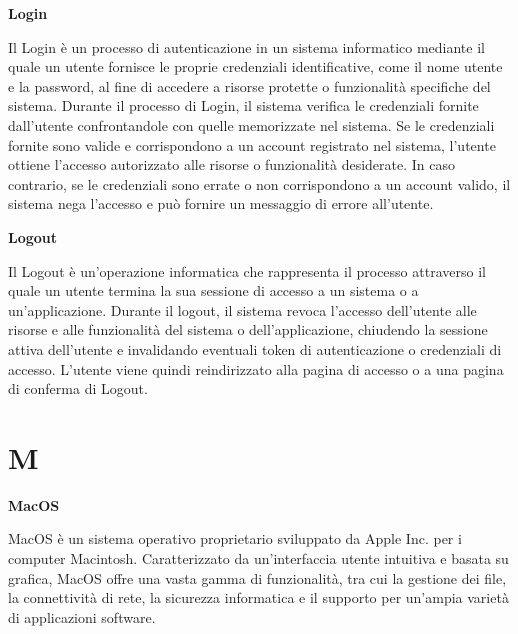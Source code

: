 \documentclass{article}
\begin{document}
\vspace{0.4cm}

\textbf{Login}

\vspace{0.1cm}

Il Login è un processo di autenticazione in un sistema informatico mediante il quale un utente fornisce le proprie credenziali identificative, come il nome utente e la password, al fine di accedere a risorse protette o funzionalità specifiche del sistema. Durante il processo di Login, il sistema verifica le credenziali fornite dall'utente confrontandole con quelle memorizzate nel sistema. Se le credenziali fornite sono valide e corrispondono a un account registrato nel sistema, l'utente ottiene l'accesso autorizzato alle risorse o funzionalità desiderate. In caso contrario, se le credenziali sono errate o non corrispondono a un account valido, il sistema nega l'accesso e può fornire un messaggio di errore all'utente.

\vspace{0.4cm}

\textbf{Logout}

\vspace{0.1cm}

Il Logout è un'operazione informatica che rappresenta il processo attraverso il quale un utente termina la sua sessione di accesso a un sistema o a un'applicazione. Durante il logout, il sistema revoca l'accesso dell'utente alle risorse e alle funzionalità del sistema o dell'applicazione, chiudendo la sessione attiva dell'utente e invalidando eventuali token di autenticazione o credenziali di accesso. L'utente viene quindi reindirizzato alla pagina di accesso o a una pagina di conferma di Logout.

\pagebreak
\section*{M}
{}

\vspace{0.4cm}

\textbf{MacOS}

\vspace{0.1cm}

MacOS è un sistema operativo proprietario sviluppato da Apple Inc. per i computer Macintosh. Caratterizzato da un'interfaccia utente intuitiva e basata su grafica, MacOS offre una vasta gamma di funzionalità, tra cui la gestione dei file, la connettività di rete, la sicurezza informatica e il supporto per un'ampia varietà di applicazioni software.
\end{document}

